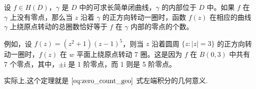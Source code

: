 \documentclass[../../main.tex]{subfiles}
\begin{document}
\begin{theorem}[辐角原理]\label{theorem:辐角原理-定理4.4.2}
设 \( f \in H(D) \)，\( \gamma \) 是 \( D \) 中的可求长简单闭曲线，\( \gamma \) 的内部位于 \( D \) 中。如果 \( f \) 在 \( \gamma \) 上没有零点，那么当 \( z \) 沿着 \( \gamma \) 的正方向转动一圈时，函数 \( f(z) \) 在相应的曲线 \( \gamma \) 上绕原点转动的总圈数恰好等于 \( f \) 在 \( \gamma \) 内部的零点的个数。
\end{theorem}
\begin{remark}
例如，设 \( f(z) = (z^2 + 1)(z - 1)^5 \)，则当 \( z \) 沿着圆周 \( \{ z: |z| = 3 \} \) 的正方向转动一圈时，\( f(z) \) 在 \( w \) 平面上绕原点转动 7 圈。这是因为 \( f \) 在 \( B(0, 3) \) 中共有 7 个零点，其中，\( \pm \mathrm{i} \) 是 1 阶零点，而 1 则是 5 阶零点。
\end{remark}
\begin{note}
实际上,这个定理就是 \(\eqref{eq:zero_count_geo}\) 式左端积分的几何意义.
\end{note}
\end{document}
